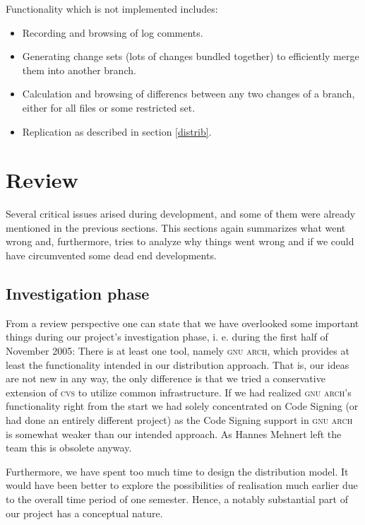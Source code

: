 \documentclass[fleqn, 10pt, a4paper]{report} \usepackage{amssymb}
\begin{document}
Functionality which is not implemented includes:

\begin{itemize}
\item Recording and browsing of log comments.
\item Generating change sets (lots of changes bundled together) to
  efficiently merge them into another branch.
\item Calculation and browsing of differencs between any two changes
  of a branch, either for all files or some restricted set.
\item Replication as described in section \ref{distrib}.
\end{itemize}


\section{Review}

Several critical issues arised during development, and some of them
were already mentioned in the previous sections.
This sections again summarizes what went wrong and, furthermore, tries
to analyze why things went wrong and if we could have circumvented
some dead end developments.


\subsection{Investigation phase}

From a review perspective one can state that we have overlooked some
important things during our project's investigation phase, i. e.
during the first half of November 2005: There is at least one tool,
namely \textsc{gnu arch}, which provides at least the functionality
intended in our distribution approach. That is, our ideas are
not new in any way, the only difference is that we tried a conservative
extension of \textsc{cvs} to utilize common infrastructure.
If we had realized \textsc{gnu arch}'s functionality right from the
start we had solely concentrated on Code Signing (or had done an
entirely different project) as the Code Signing support in \textsc{gnu arch}
is somewhat weaker than our intended approach. As Hannes Mehnert
left the team this is obsolete anyway.

Furthermore, we have spent too much time to design the distribution model.
It would have been better to explore the possibilities of realisation
much earlier due to the overall time period of one semester. Hence,
a notably substantial part of our project has a conceptual nature.
\end{document}
